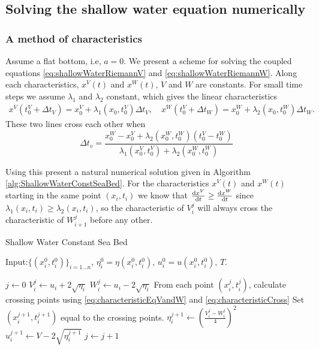 \documentclass[12pt]{article}
\begin{document}
\subsection{Solving the shallow water equation numerically}

\subsubsection{A method of characteristics}
Assume a flat bottom, i.e, $a = 0$. We present a scheme for solving the coupled equations \eqref{eq:shallowWaterRiemannV} and \eqref{eq:shallowWaterRiemannW}. Along each characteristics, $x^V(t)$ and $x^W(t)$, $V$ and $W$ are constants. For small time steps we assume $\lambda_1$ and $\lambda_2$ constant, which gives the linear characteristics
\begin{align}
	\label{eq:characteristicEqVandW}
	x^V(t^V_0+\Delta t_V) = x^V_0 + \lambda_1(x_0,t^V_0)\Delta t_V ,\quad x^W(t^V_0+\Delta t_W) = x^W_0 + \lambda_2(x_0,t_0^W)\Delta t_W.
\end{align}
These two lines cross each other when 
\begin{equation}
\label{eq:characteristicCross}
\Delta t_v = \frac{x_0^W - x_0^V + \lambda_2(x_0^W,t_0^W)(t_0^V - t_0^W)}{\lambda_1(x_0^V,t_0^V)+\lambda_2(x_0^W,t_0^W)}
\end{equation}

Using this present a natural numerical solution given in  Algorithm \ref{alg:ShallowWaterConstSeaBed}.  
For the characteristics $x^V(t)$ and $x^W(t)$ starting in the same point $(x_i,t_i)$ we know that $\frac{\operatorname{d}\! x^V}{\operatorname{d}\! t}\geq \frac{\operatorname{d}\! x^W}{\operatorname{d}\! t}$ since $\lambda_1(x_i,t_i)\geq \lambda_2(x_i,t_i)$, so the characteristic of $V_i^j$ will always cross the characteristic of $W_{i+1}^j$ before any other. 
\begin{algorithm}
	\caption{Shallow Water Constant Sea Bed}
	\begin{algorithmic}[1]
		\State    Input:$\{(x^0_i,t^0_i)\}_{i=1\ldots n}$, $\eta^0_i=\eta(x^0_i,t^0_i)$, $u^0_i = u(x_i^0,t^0_i)$,  $T$.

		\State $j\leftarrow 0$
		\State $V^j_i \leftarrow u_i + 2\sqrt{\eta_i}$
		\State $W^j_i \leftarrow u_i - 2\sqrt{\eta_i}$
		\State From each point $(x^j_i,t^j_i)$, calculate crossing points using 		
		\eqref{eq:characteristicEqVandW} and \eqref{eq:characteristicCross}
		\State Set $(x^{j+1}_i,t^{j+1}_i)$ equal to the crossing points.
		\State $\eta_i^{j+1} \leftarrow \left(\frac{V_i^j -W_i^j}{4}\right)^2$
		\State $u_i^{j+1} \leftarrow V - 2\sqrt{\eta_i^{j+1}}$
		\State $j\leftarrow j + 1$
		\EndWhile
	\end{algorithmic}
	\label{alg:ShallowWaterConstSeaBed}
\end{algorithm}
\end{document}
